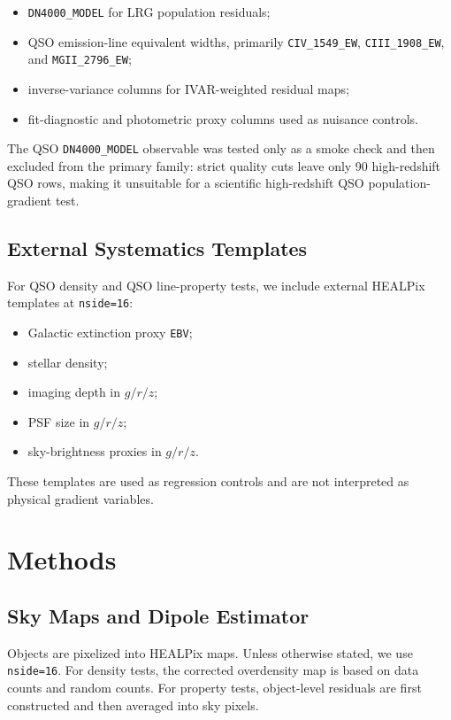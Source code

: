 \documentclass[11pt]{article}
\begin{document}
\begin{itemize}
    \item \texttt{DN4000\_MODEL} for LRG population residuals;
    \item QSO emission-line equivalent widths, primarily \texttt{CIV\_1549\_EW}, \texttt{CIII\_1908\_EW}, and \texttt{MGII\_2796\_EW};
    \item inverse-variance columns for IVAR-weighted residual maps;
    \item fit-diagnostic and photometric proxy columns used as nuisance controls.
\end{itemize}

The QSO \texttt{DN4000\_MODEL} observable was tested only as a smoke check and then excluded from the primary family: strict quality cuts leave only 90 high-redshift QSO rows, making it unsuitable for a scientific high-redshift QSO population-gradient test.

\subsection{External Systematics Templates}

For QSO density and QSO line-property tests, we include external HEALPix templates at \texttt{nside=16}:

\begin{itemize}
    \item Galactic extinction proxy \texttt{EBV};
    \item stellar density;
    \item imaging depth in $g/r/z$;
    \item PSF size in $g/r/z$;
    \item sky-brightness proxies in $g/r/z$.
\end{itemize}

These templates are used as regression controls and are not interpreted as physical gradient variables.

\section{Methods}

\subsection{Sky Maps and Dipole Estimator}

Objects are pixelized into HEALPix maps. Unless otherwise stated, we use \texttt{nside=16}. For density tests, the corrected overdensity map is based on data counts and random counts. For property tests, object-level residuals are first constructed and then averaged into sky pixels.
\end{document}
